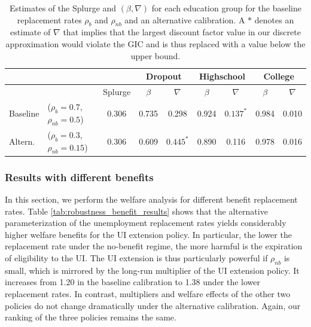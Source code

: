 \documentclass[\econtexRoot/HAFiscal]{subfiles}
\begin{document}
\begin{table}[t]
  \begin{center}
    \begin{tabular}{llc|cccccc} 
      \toprule
      & & & \multicolumn{2}{c}{Dropout} & \multicolumn{2}{c}{Highschool} & \multicolumn{2}{c}{College} \\ \midrule 
      & & Splurge & $\beta$ & $\nabla$ & $\beta$ & $\nabla$ & $\beta$ & $\nabla$ \\ \midrule 
      Baseline & ($\rho_{b}=0.7$, $\rho_{nb}=0.5$) & 0.306 & 0.735 & 0.298 & 0.924 & $0.137^{*}$ & 0.984 & 0.010 \\ 
      Altern. & ($\rho_{b}=0.3$,  $\rho_{nb}=0.15$) & 0.306 & 0.609 & $0.445^{*}$ & 0.890 & 0.116 & 0.978 & 0.016
      \\ \bottomrule 
    \end{tabular}
  \end{center}
  \caption{Estimates of the Splurge and $(\beta,\nabla)$ for each education group for the baseline replacement rates $\rho_{b}$ and $\rho_{nb}$ and an alternative calibration. A $*$ denotes an estimate of $\nabla$ that implies that the largest discount factor value in our discrete approximation would violate the GIC and is thus replaced with a value below the upper bound.}
  \notinsubfile{\label{tab:robustness_benefits}}
\end{table}


\FloatBarrier
\subsubsection{Results with different benefits}
\notinsubfile{\label{sec:robust_benefits_results}}

In this section, we perform the welfare analysis for different benefit replacement rates. Table \ref{tab:robustness_benefit_results} shows that the alternative parameterization of the unemployment replacement rates yields considerably higher welfare benefits for the UI extension policy. In particular, the lower the replacement rate under the no-benefit regime, the more harmful is the expiration of eligibility to the UI. The UI extension is thus particularly powerful if $\rho_{nb}$ is small, which is mirrored by the long-run multiplier of the UI extension policy. It increases from 1.20 in the baseline calibration to 1.38 under the lower replacement rates. In contrast, multipliers and welfare effects of the other two policies do not change dramatically under the alternative calibration. Again, our ranking of the three policies remains the same.
\end{document}
